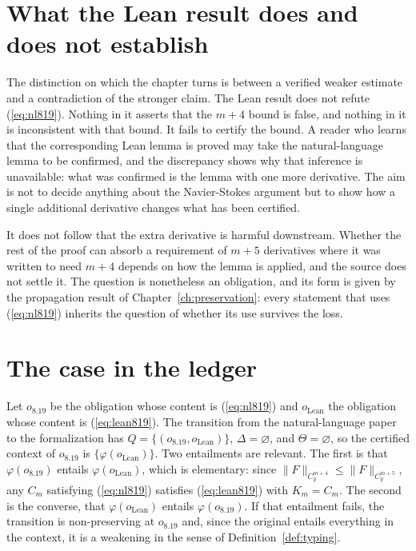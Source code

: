 \section{What the Lean result does and does not establish}

The distinction on which the chapter turns is between a verified weaker estimate and a contradiction of the stronger claim. The Lean result does not refute (\ref{eq:nl819}). Nothing in it asserts that the $m+4$ bound is false, and nothing in it is inconsistent with that bound. It fails to certify the bound. A reader who learns that the corresponding Lean lemma is proved may take the natural-language lemma to be confirmed, and the discrepancy shows why that inference is unavailable: what was confirmed is the lemma with one more derivative. The aim is not to decide anything about the Navier-Stokes argument but to show how a single additional derivative changes what has been certified.

It does not follow that the extra derivative is harmful downstream. Whether the rest of the proof can absorb a requirement of $m+5$ derivatives where it was written to need $m+4$ depends on how the lemma is applied, and the source does not settle it. The question is nonetheless an obligation, and its form is given by the propagation result of Chapter~\ref{ch:preservation}: every statement that uses (\ref{eq:nl819}) inherits the question of whether its use survives the loss.

\section{The case in the ledger}

Let $o_{8.19}$ be the obligation whose content is (\ref{eq:nl819}) and $o_{\mathrm{Lean}}$ the obligation whose content is (\ref{eq:lean819}). The transition from the natural-language paper to the formalization has $Q = \{(o_{8.19}, o_{\mathrm{Lean}})\}$, $\Delta = \varnothing$, and $\Theta = \varnothing$, so the certified context of $o_{8.19}$ is $\{\varphi(o_{\mathrm{Lean}})\}$. Two entailments are relevant. The first is that $\varphi(o_{8.19})$ entails $\varphi(o_{\mathrm{Lean}})$, which is elementary: since $\|F\|_{C^{m+4}_y} \le \|F\|_{C^{m+5}_y}$, any $C_m$ satisfying (\ref{eq:nl819}) satisfies (\ref{eq:lean819}) with $K_m = C_m$. The second is the converse, that $\varphi(o_{\mathrm{Lean}})$ entails $\varphi(o_{8.19})$. If that entailment fails, the transition is non-preserving at $o_{8.19}$ and, since the original entails everything in the context, it is a weakening in the sense of Definition~\ref{def:typing}.

